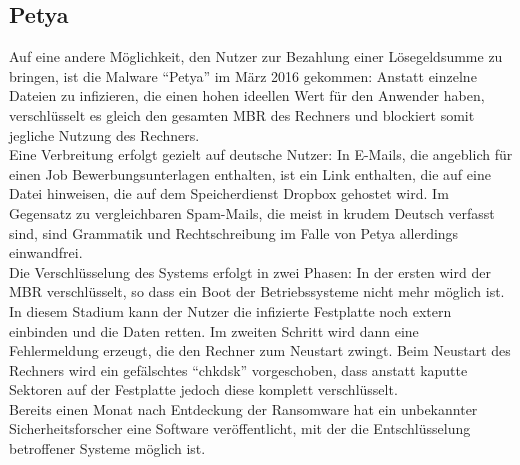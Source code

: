 \subsection{Petya}
Auf eine andere Möglichkeit, den Nutzer zur Bezahlung einer Lösegeldsumme zu bringen, ist die Malware ``Petya'' im März 2016 gekommen: Anstatt einzelne Dateien zu infizieren, die einen hohen ideellen Wert für den Anwender haben, verschlüsselt es gleich den gesamten MBR des Rechners und blockiert somit jegliche Nutzung des Rechners\cite{petya:start}.\\
Eine Verbreitung erfolgt gezielt auf deutsche Nutzer: In E-Mails, die angeblich für einen Job Bewerbungsunterlagen enthalten, ist ein Link enthalten, die auf eine Datei hinweisen, die auf dem Speicherdienst Dropbox gehostet wird. Im Gegensatz zu vergleichbaren Spam-Mails, die meist in krudem Deutsch verfasst sind, sind Grammatik und Rechtschreibung im Falle von Petya allerdings einwandfrei.\\
Die Verschlüsselung des Systems erfolgt in zwei Phasen\cite{petya:stop}: In der ersten wird der MBR verschlüsselt, so dass ein Boot der Betriebssysteme nicht mehr möglich ist. In diesem Stadium kann der Nutzer die infizierte Festplatte noch extern einbinden und die Daten retten. Im zweiten Schritt wird dann eine Fehlermeldung erzeugt, die den Rechner zum Neustart zwingt. Beim Neustart des Rechners wird ein gefälschtes ``chkdsk'' vorgeschoben, dass anstatt kaputte Sektoren auf der Festplatte jedoch diese komplett verschlüsselt.\\
Bereits einen Monat nach Entdeckung der Ransomware hat ein unbekannter Sicherheitsforscher eine Software veröffentlicht, mit der die Entschlüsselung betroffener Systeme möglich ist\cite{petya:end}.